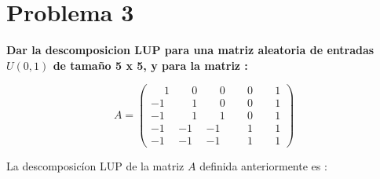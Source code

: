 \documentclass[12pt,letterpaper]{article}
\begin{document}
\section*{Problema 3}

\textbf{Dar  la  descomposicion  LUP  para  una  matriz  aleatoria  de  entradas $U(0,1)$ de tama\~no 5 x 5, y para la matriz :}

\begin{equation*}
        A = \begin{pmatrix}
                \phantom{-}1& \phantom{-}0 & \phantom{-}0 & \phantom{-}0 & \phantom{-}1\\ 
                -1& \phantom{-}1 & \phantom{-}0 & \phantom{-}0 & \phantom{-}1 \\ 
                -1& \phantom{-}1 & \phantom{-}1 & \phantom{-}0 & \phantom{-}1 \\ 
                -1&-1 &-1 & \phantom{-}1 & \phantom{-}1 \\ 
                -1&-1 &-1 & \phantom{-}1 & \phantom{-}1
            \end{pmatrix}
\end{equation*}

La descomposic\'ion LUP de la matriz $A$ definida anteriormente es :
\end{document}
